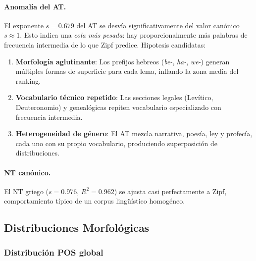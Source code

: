 \documentclass[12pt,a4paper]{article}
\begin{document}
\paragraph{Anomal\'ia del AT.}
El exponente $s = 0.679$ del AT se desv\'ia significativamente del valor can\'onico $s \approx 1$.
Esto indica una \emph{cola m\'as pesada}: hay proporcionalmente m\'as palabras de frecuencia
intermedia de lo que Zipf predice. Hipotesis candidatas:

\begin{enumerate}[leftmargin=2em]
\item \textbf{Morfolog\'ia aglutinante}: Los prefijos hebreos (\textit{be-}, \textit{ha-}, \textit{we-})
      generan m\'ultiples formas de superficie para cada lema, inflando la zona media del ranking.
\item \textbf{Vocabulario t\'ecnico repetido}: Las secciones legales (Lev\'itico, Deuteronomio)
      y geneal\'ogicas repiten vocabulario especializado con frecuencia intermedia.
\item \textbf{Heterogeneidad de g\'enero}: El AT mezcla narrativa, poes\'ia, ley y profec\'ia,
      cada uno con su propio vocabulario, produciendo superposici\'on de distribuciones.
\end{enumerate}

\paragraph{NT can\'onico.}
El NT griego ($s = 0.976$, $R^2 = 0.962$) se ajusta casi perfectamente a Zipf,
comportamiento t\'ipico de un corpus ling\"u\'istico homog\'eneo.


\subsection{Distribuciones Morfol\'ogicas}

\subsubsection{Distribuci\'on POS global}
\end{document}
